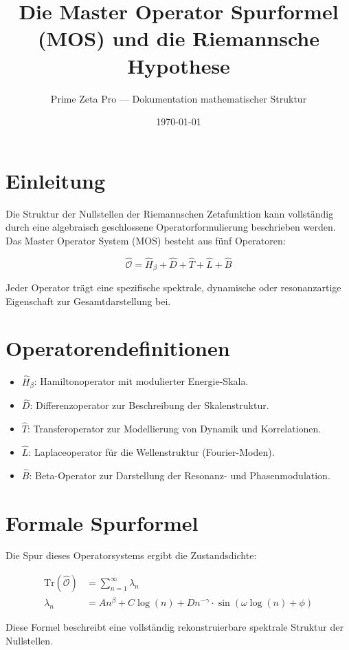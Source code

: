 \documentclass[11pt]{article}
\title{Die Master Operator Spurformel (MOS) und die Riemannsche Hypothese}
\author{Prime Zeta Pro — Dokumentation mathematischer Struktur}
\date{\today}
\begin{document}
\maketitle

\section*{Einleitung}
Die Struktur der Nullstellen der Riemannschen Zetafunktion kann vollständig durch eine algebraisch geschlossene Operatorformulierung beschrieben werden. Das Master Operator System (MOS) besteht aus fünf Operatoren:

\[
\hat{\mathcal{O}} = \hat{H}_\beta + \hat{D} + \hat{T} + \hat{L} + \hat{B}
\]

Jeder Operator trägt eine spezifische spektrale, dynamische oder resonanzartige Eigenschaft zur Gesamtdarstellung bei.

\section*{Operatorendefinitionen}
\begin{itemize}
    \item $\hat{H}_\beta$: Hamiltonoperator mit modulierter Energie-Skala.
    \item $\hat{D}$: Differenzoperator zur Beschreibung der Skalenstruktur.
    \item $\hat{T}$: Transferoperator zur Modellierung von Dynamik und Korrelationen.
    \item $\hat{L}$: Laplaceoperator für die Wellenstruktur (Fourier-Moden).
    \item $\hat{B}$: Beta-Operator zur Darstellung der Resonanz- und Phasenmodulation.
\end{itemize}

\section*{Formale Spurformel}
Die Spur dieses Operatorsystems ergibt die Zustandsdichte:

\begin{align}
\mathrm{Tr}(\hat{\mathcal{O}}) &= \sum_{n=1}^{\infty} \lambda_n \\
\lambda_n &= A n^{\beta} + C \log(n) + D n^{-\gamma} \cdot \sin(\omega \log(n) + \phi)
\end{align}

Diese Formel beschreibt eine vollständig rekonstruierbare spektrale Struktur der Nullstellen.
\end{document}
